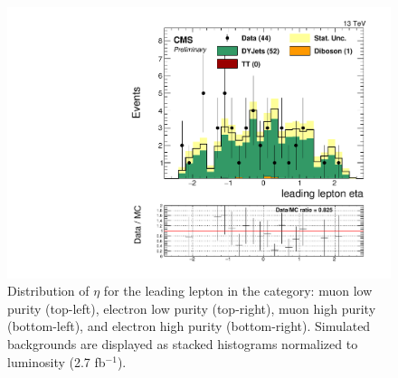 \begin{figure}[h]
\begin{center}
\includegraphics[scale=0.37]{figures/control/etalep1EHP.pdf}
\caption[Distribution of $\eta$ for the leading lepton]{Distribution of $\eta$ for the leading lepton in the category: muon low purity (top-left), electron low purity (top-right), muon high purity (bottom-left), and  electron high purity (bottom-right). Simulated backgrounds are displayed as stacked histograms normalized to luminosity (2.7 fb$^{-1}$).}
\label{etalep1_VZ}
\end{center}
\end{figure}
